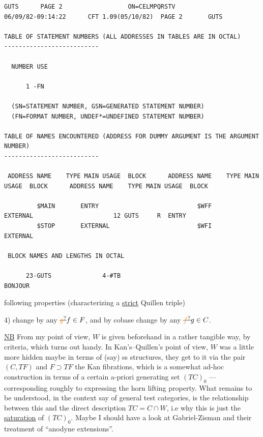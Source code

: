 {\fontsize{5}{6}\selectfont
\begin{verbatim}
GUTS      PAGE 2                  ON=CELMPQRSTV                06/09/82-09:14:22      CFT 1.09(05/10/82)  PAGE 2       GUTS

TABLE OF STATEMENT NUMBERS (ALL ADDRESSES IN TABLES ARE IN OCTAL)
--------------------------

  NUMBER USE

      1 -FN

  (SN=STATEMENT NUMBER, GSN=GENERATED STATEMENT NUMBER)
  (FN=FORMAT NUMBER, UNDEF*=UNDEFINED STATEMENT NUMBER)

TABLE OF NAMES ENCOUNTERED (ADDRESS FOR DUMMY ARGUMENT IS THE ARGUMENT NUMBER)
--------------------------

 ADDRESS NAME    TYPE MAIN USAGE  BLOCK      ADDRESS NAME    TYPE MAIN USAGE  BLOCK      ADDRESS NAME    TYPE MAIN USAGE  BLOCK

         $MAIN       ENTRY                           $WFF        EXTERNAL                      12 GUTS     R  ENTRY
         $STOP       EXTERNAL                        $WFI        EXTERNAL

 BLOCK NAMES AND LENGTHS IN OCTAL

      23-GUTS              4-#TB
BONJOUR
\end{verbatim}
}

following properties (characterizing a \uline{strict} Quillen triple)

4)   change by any $\deleted{\unsure{g}}f\in F$, and by cobase change by any $\deleted{\unsure{f}}g\in C$.

 \uline{NB} From my point of view, $W$ is given beforehand in a rather tangible way, by  criteria, which turns out  handy. In Kan's--Quillen's point of view, $W$ was a little more hidden maybe in terms of (say) ss structures, they get to it via  the pair $(C,TF)$ and $F\supset TF$ the Kan fibrations, which is a somewhat ad-hoc construction in terms of a certain  a-priori generating set $(TC)_0$ --- corresponding roughly to expressing the horn lifting property. What remains to be understood, in the context say of general test categories, is the relationship between this and the direct description $TC=C\cap W$,  i.e why this is just the \uline{saturation} of $(TC)_0$. Maybe I should have a look at Gabriel-Zisman and their treatment of ``anodyne extensions''.

